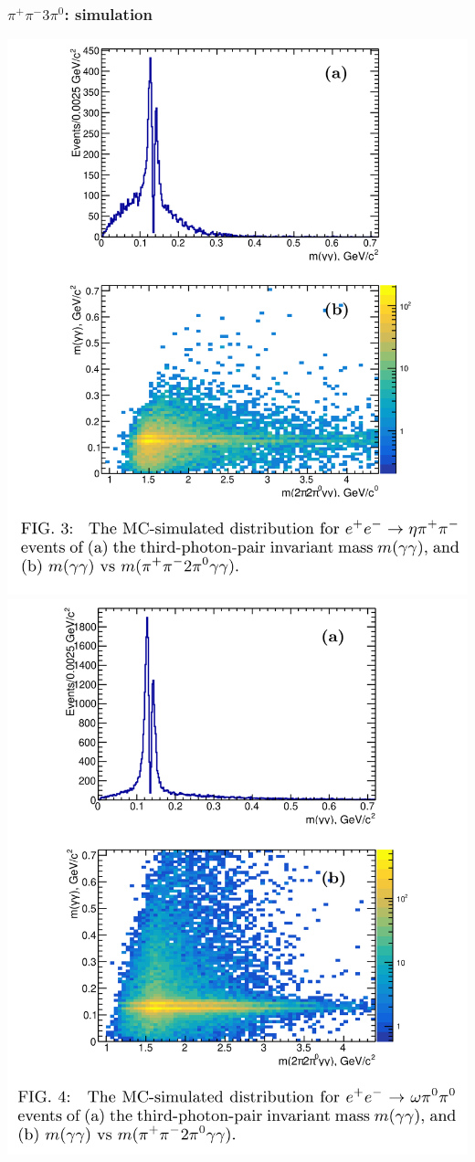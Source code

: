 \documentclass[10pt, aspectratio=169]{beamer}
\def\pip{\pi^+}
\def\pim{\pi^-}
\def\piz{\pi^0}
\begin{document}
\begin{frame}[label=3pi-simulation]%
  \frametitle{$\pip\pim3\piz$: simulation}
  \centering

  \includegraphics[height=.8\textheight]{figures/003/fig003}
  \hspace{5ex}
  \includegraphics[height=.8\textheight]{figures/003/fig004}
\end{frame}%
\end{document}
